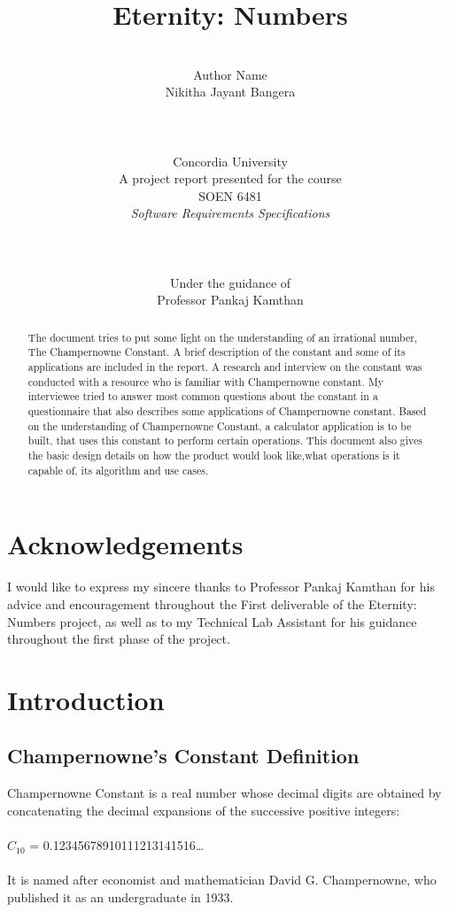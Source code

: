 \documentclass[12pt, a4paper]{report}
\date{}
\title{Eternity: Numbers}
\author{\\ \Large{Author Name}
\\ Nikitha Jayant Bangera
\\
\\
\\
\\ Concordia University
\\
A project report presented for the course\\ 
SOEN 6481 \\\textit{Software Requirements Specifications}
\\ \\ \\ \\
Under the guidance of\\
Professor Pankaj Kamthan
}
\begin{document}
\thispagestyle{headings}
	\maketitle
{}

\thispagestyle{empty}
\chapter*{Acknowledgements}
I would like to express my sincere thanks to Professor Pankaj Kamthan for his advice and encouragement throughout the First deliverable of the Eternity: Numbers project, as well as to my Technical Lab Assistant for his guidance throughout the first phase of the project. 
\thispagestyle{empty}
\begin{abstract}
The document tries to put some light on the understanding of an irrational number, The Champernowne Constant. A brief description of the constant and some of its applications are included in the report. A research and interview on the constant was conducted with a resource who is familiar with Champernowne constant. My interviewee tried to answer most common questions about the constant in a questionnaire that also describes some applications of Champernowne constant. Based on the understanding of Champernowne Constant, a calculator application is to be built, that uses this constant to perform certain operations. This document also gives the basic design details on how the product would look like,what operations is it capable of, its algorithm and use cases.
\end{abstract}

\tableofcontents
\thispagestyle{plain}
\listoffigures
\listoftables

\chapter{Introduction}
\section{Champernowne's Constant Definition}
\quad Champernowne Constant is a real number whose decimal digits are obtained by concatenating the decimal expansions of the successive positive integers:\\\\
\hspace*{30mm} $C_{10}$ = 0.12345678910111213141516…\\\\
It is named after economist and mathematician David G. Champernowne, who published it as an undergraduate in 1933.\\
\end{document}
